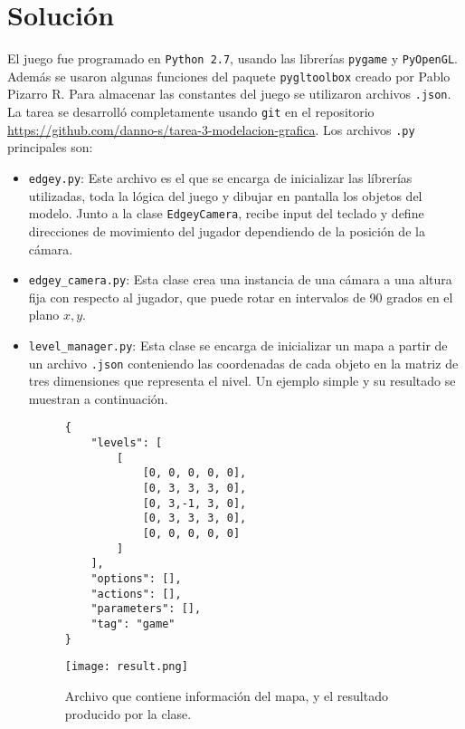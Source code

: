 \documentclass[letterpaper,11pt]{article} %
\begin{document}
\section{Solución}
	El juego fue programado en \verb!Python 2.7!, usando las librerías \verb!pygame! y \verb!PyOpenGL!. Además se usaron algunas funciones del paquete \verb!pygltoolbox! creado por Pablo Pizarro R. Para almacenar las constantes del juego se utilizaron archivos \verb!.json!. La tarea se desarrolló completamente usando \verb!git! en el repositorio \url{https://github.com/danno-s/tarea-3-modelacion-grafica}. Los archivos \verb!.py! principales son:
	\begin{itemize}
		\item \verb!edgey.py!:
		Este archivo es el que se encarga de inicializar las líbrerías utilizadas, toda la lógica del juego y dibujar en pantalla los objetos del modelo. Junto a la clase \verb!EdgeyCamera!, recibe input del teclado y define direcciones de movimiento del jugador dependiendo de la posición de la cámara.
		\item \verb!edgey_camera.py!:
		Esta clase crea una instancia de una cámara a una altura fija con respecto al jugador, que puede rotar en intervalos de 90 grados en el plano $x,y$.
		\item \verb!level_manager.py!:
		Esta clase se encarga de inicializar un mapa a partir de un archivo \verb!.json! conteniendo las coordenadas de cada objeto en la matriz de tres dimensiones que representa el nivel. Un ejemplo simple y su resultado se muestran a continuación.

		\begin{figure}[h]
			\begin{minipage}{0.45\textwidth}
				\centering
				\begin{lstlisting}
{
	"levels": [
		[
			[0, 0, 0, 0, 0],
			[0, 3, 3, 3, 0],
			[0, 3,-1, 3, 0],
			[0, 3, 3, 3, 0],
			[0, 0, 0, 0, 0]
		]
	],
	"options": [],
	"actions": [],
	"parameters": [],
	"tag": "game"
}
				\end{lstlisting}
			\end{minipage}
			\begin{minipage}{0.45\textwidth}
				\centering
				\texttt{[image: result.png]}
			\end{minipage}
			\caption{Archivo que contiene información del mapa, y el resultado producido por la clase.}
		\end{figure}


\end{itemize}
\end{document}

